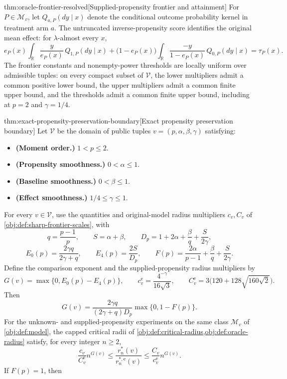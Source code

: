 \begin{theoremv}{thm:oracle-frontier-resolved}[Supplied-propensity frontier and attainment]
For \(P\in\mathcal M_v\), let \(Q_{a,P}(dy\mid x)\) denote the conditional outcome probability kernel in treatment arm \(a\). The untruncated inverse-propensity score identifies the original mean effect: for \(\lambda\)-almost every \(x\),
\[
e_P(x)\int_{\mathbb R}\frac{y}{e_P(x)}\,Q_{1,P}(dy\mid x)
+
\bigl(1-e_P(x)\bigr)
\int_{\mathbb R}\frac{-y}{1-e_P(x)}\,Q_{0,P}(dy\mid x)
=\tau_P(x).
\]
The frontier constants and nonempty-power thresholds are locally uniform over admissible tuples: on every compact subset of \(\mathcal V\), the lower multipliers admit a common positive lower bound, the upper multipliers admit a common finite upper bound, and the thresholds admit a common finite upper bound, including at \(p=2\) and \(\gamma=1/4\).
\end{theoremv}

\begin{theoremv}{thm:exact-propensity-preservation-boundary}[Exact propensity preservation boundary]
Let \(\mathcal V\) be the domain of public tuples \(v=(p,\alpha,\beta,\gamma)\) satisfying:
\begin{itemize}
\item \textbf{(Moment order.)} \(1<p\le2\).
\item \textbf{(Propensity smoothness.)} \(0<\alpha\le1\).
\item \textbf{(Baseline smoothness.)} \(0<\beta\le1\).
\item \textbf{(Effect smoothness.)} \(1/4\le\gamma\le1\).
\end{itemize}
For every \(v\in\mathcal V\), use the quantities and original-model radius multipliers \(c_v,C_v\) of \cref{obj:def:sharp-frontier-scales}, with
\[
q=\frac{p-1}{p},\qquad S=\alpha+\beta,\qquad
D_p=1+2\alpha+\frac{\beta}{q}+\frac{S}{2\gamma},
\]
\[
E_0(p)=\frac{2\gamma q}{2\gamma+q},\qquad
E_4(p)=\frac{2S}{D_p},\qquad
F(p)=\frac{2\alpha}{p-1}+\frac{\beta}{q}+\frac{S}{2\gamma}.
\]
Define the comparison exponent and the supplied-propensity radius multipliers by
\[
G(v)=\max\{0,E_0(p)-E_4(p)\},\qquad
c^{\mathrm e}_v=\frac{4^{-\gamma}}{16\sqrt3},\qquad
C^{\mathrm e}_v=3\bigl(120+128\sqrt{160\sqrt2}\bigr).
\]
Then
\[
G(v)=
\frac{2\gamma q}{(2\gamma+q)D_p}\max\{0,1-F(p)\}.
\]
For the unknown- and supplied-propensity experiments on the same class \(\mathcal M_v\) of \cref{obj:def:model}, the capped critical radii of \cref{obj:def:critical-radius,obj:def:oracle-radius} satisfy, for every integer \(n\ge2\),
\[
\frac{c_v}{C^{\mathrm e}_v}n^{G(v)}
\le
\frac{r_n^*(v)}{r_n^{*,\mathrm e}(v)}
\le
\frac{C_v}{c^{\mathrm e}_v}n^{G(v)}.
\]
If \(F(p)=1\), then

\end{theoremv}
